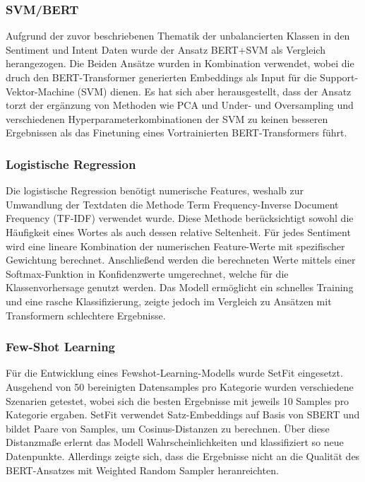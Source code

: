 \subsubsection{SVM/BERT}

Aufgrund der zuvor beschriebenen Thematik der unbalancierten Klassen in den Sentiment und
Intent Daten wurde der Ansatz BERT+SVM als Vergleich herangezogen. Die Beiden Ansätze wurden
in Kombination verwendet, wobei die druch den BERT-Transformer generierten Embeddings als Input
für die Support-Vektor-Machine (SVM) dienen. Es hat sich aber herausgestellt, dass der Ansatz
torzt der ergänzung von Methoden wie PCA und Under- und Oversampling und verschiedenen
Hyperparameterkombinationen der SVM zu keinen besseren Ergebnissen als das Finetuning eines
Vortrainierten BERT-Transformers führt.  

\subsubsection{Logistische Regression}

Die logistische Regression benötigt numerische Features, weshalb zur Umwandlung der 
Textdaten die Methode Term Frequency-Inverse Document Frequency (TF-IDF) verwendet wurde. Diese Methode 
berücksichtigt sowohl die Häufigkeit eines Wortes als auch dessen relative Seltenheit. Für jedes Sentiment 
wird eine lineare Kombination der numerischen Feature-Werte mit spezifischer Gewichtung berechnet.
 Anschließend werden die berechneten Werte mittels einer Softmax-Funktion in Konfidenzwerte umgerechnet,
  welche für die Klassenvorhersage genutzt werden. Das Modell ermöglicht ein schnelles Training und eine rasche Klassifizierung,
 zeigte jedoch im Vergleich zu Ansätzen mit Transformern schlechtere Ergebnisse. 

\subsubsection{Few-Shot Learning}

Für die Entwicklung eines Fewshot-Learning-Modells wurde SetFit eingesetzt. Ausgehend von
50 bereinigten Datensamples pro Kategorie wurden verschiedene Szenarien getestet, wobei sich
die besten Ergebnisse mit jeweils 10 Samples pro Kategorie ergaben. SetFit verwendet
Satz-Embeddings auf Basis von SBERT und bildet Paare von Samples, um Cosinus-Distanzen zu
berechnen. Über diese Distanzmaße erlernt das Modell Wahrscheinlichkeiten und klassifiziert so
neue Datenpunkte. Allerdings zeigte sich, dass die Ergebnisse nicht an die Qualität des
BERT-Ansatzes mit Weighted Random Sampler heranreichten.

